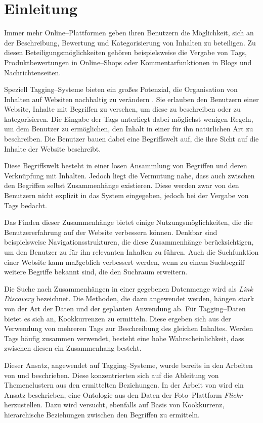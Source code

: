 \chapter{Einleitung}

Immer mehr Online--Plattformen geben ihren Benutzern die Möglichkeit, sich an der Beschreibung, Bewertung und Kategorisierung von Inhalten zu beteiligen. Zu diesen Beteiligungsmöglichkeiten gehören beispielsweise die Vergabe von Tags, Produktbewertungen in Online--Shops oder Kommentarfunktionen in Blogs und Nachrichtenseiten. 

Speziell Tagging--Systeme bieten ein großes Potenzial, die Organisation von Inhalten auf Websiten nachhaltig zu verändern \cite{sc2005}. Sie erlauben den Benutzern einer Website, Inhalte mit Begriffen zu versehen, um diese zu beschreiben oder zu kategorisieren. Die Eingabe der Tags unterliegt dabei möglichst wenigen Regeln, um dem Benutzer zu ermöglichen, den Inhalt in einer für ihn natürlichen Art zu beschreiben. Die Benutzer bauen dabei eine Begriffswelt auf, die ihre Sicht auf die Inhalte der Website beschreibt.

Diese Begriffswelt besteht in einer losen Ansammlung von Begriffen und deren Verknüpfung mit Inhalten. Jedoch liegt die Vermutung nahe, dass auch zwischen den Begriffen selbst Zusammenhänge existieren. Diese werden zwar von den Benutzern nicht explizit in das System eingegeben, jedoch bei der Vergabe von Tags bedacht.

Das Finden dieser Zusammenhänge bietet einige Nutzungsmöglichkeiten, die die Benutzererfahrung auf der Website verbessern können. Denkbar sind beispielsweise Navigationsstrukturen, die diese Zusammenhänge berücksichtigen, um den Benutzer zu für ihn relevanten Inhalten zu führen. Auch die Suchfunktion einer Website kann maßgeblich verbessert werden, wenn zu einem Suchbegriff weitere Begriffe bekannt sind, die den Suchraum erweitern.

Die Suche nach Zusammenhängen in einer gegebenen Datenmenge wird als \emph{Link Discovery} bezeichnet. Die Methoden, die dazu angewendet werden, hängen stark von der Art der Daten und der geplanten Anwendung ab. Für Tagging--Daten bietet es sich an, Kookkurrenzen zu ermitteln. Diese ergeben sich aus der Verwendung von mehreren Tags zur Beschreibung des gleichen Inhaltes. Werden Tags häufig zusammen verwendet, besteht eine hohe Wahrscheinlichkeit, dass zwischen diesen ein Zusammenhang besteht. 

Dieser Ansatz, angewendet auf Tagging--Systeme, wurde bereits in den Arbeiten von \textcite{ps2006} und \textcite{kss2010} beschrieben. Diese konzentrierten sich auf die Ableitung von Themenclustern aus den ermittelten Beziehungen. In der Arbeit von \textcite{ps2006} wird ein Ansatz beschrieben, eine Ontologie aus den Daten der Foto--Plattform \emph{Flickr} herzustellen. Dazu wird versucht, ebenfalls auf Basis von Kookkurrenz, hierarchische Beziehungen zwischen den Begriffen zu ermitteln.

